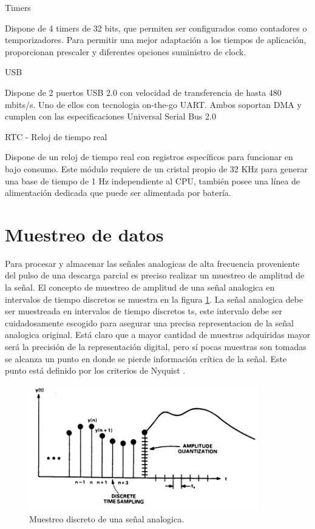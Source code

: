 Timers

Dispone de 4 timers de 32 bits, que permiten ser configurados como contadores o temporizadores. Para permitir una mejor adaptación a los tiempos de aplicación, proporcionan prescaler y diferentes opciones suministro de clock.


USB

Dispone de 2 puertos USB 2.0 con velocidad de transferencia de hasta 480 mbits/s. Uno de ellos con tecnologia on-the-go
UART. Ambos soportan DMA  y cumplen con las especificaciones Universal Serial Bus 2.0

RTC - Reloj de tiempo real

Dispone de un reloj de tiempo real con registros específicos para funcionar en bajo consumo. Este módulo requiere de un cristal propio de 32 KHz para generar una base de tiempo de 1 Hz independiente al CPU, también posee una línea de alimentación dedicada que puede ser alimentada por batería.


\section{Muestreo de datos}
Para procesar y almacenar las señales analogicas de alta frecuencia proveniente del pulso de una descarga parcial es preciso realizar un muestreo de amplitud de la señal. 
El concepto de muestreo de amplitud de una señal analogica en intervalos de tiempo discretos se muestra en la figura \ref{fig:muestreo1}.
La señal analogica debe ser muestreada en intervalos de tiempo discretos ts, este intervalo debe ser cuidadosamente escogido para asegurar una precisa representacion de la señal analogica original. Está claro que a mayor cantidad de muestras adquiridas mayor será la precisión de la representación digital, pero sí pocas muestras son tomadas se alcanza un punto en donde se pierde información crítica de la señal. Este punto está definido por los criterios de Nyquist \citep{sampling:appnote}.

\begin{figure}[ht]
	\centering
	\includegraphics[width=100mm]{./Figures/muestreo1.png}
	\caption{Muestreo discreto de una señal analogica.}
	\label{fig:muestreo1}
\end{figure}

